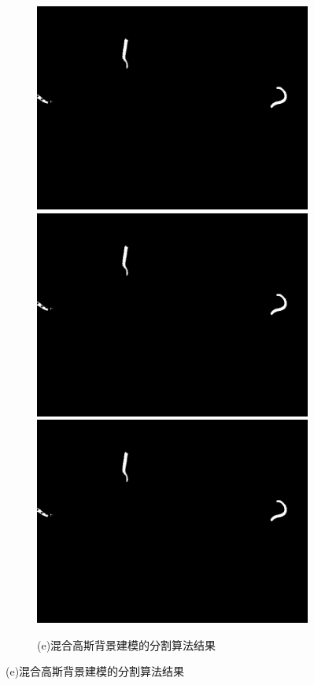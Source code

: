 \begin{figure}[!htp]
	  \begin{subfigure}{\linewidth}
		\centering
		\begin{minipage}[b]{\linewidth}
		\includegraphics[width=0.33\linewidth,natwidth=800,natheight=600]{figure/chap3/test_bksub/441.orgin.1051.jpg}
		\includegraphics[width=0.33\linewidth,natwidth=800,natheight=600]{figure/chap3/test_bksub/441.orgin.1051.jpg}
		\includegraphics[width=0.33\linewidth,natwidth=800,natheight=600]{figure/chap3/test_bksub/441.orgin.1051.jpg}
		\end{minipage}
		\caption*{(e)混合高斯背景建模的分割算法结果}
	  \end{subfigure}
\end{figure}
